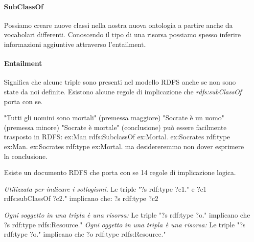 \paragraph{SubClassOf}
Possiamo creare nuove classi nella nostra nuova ontologia a partire anche da vocabolari differenti. Conoscendo il tipo di una risorsa possiamo spesso inferire informazioni aggiuntive attraverso l'entailment.
\paragraph{Entailment}
Significa che alcune triple sono presenti nel modello RDFS anche se non sono state da noi definite. Esistono alcune regole di implicazione che \textit{rdfs:subClassOf} porta con se.
\begin{info}
	\newline"Tutti gli uomini sono mortali" (premessa maggiore) \newline
	"Socrate è un uomo" (premessa minore) \newline
	"Socrate è mortale" (conclusione)\newline
	può essere facilmente trasposto in RDFS:\newline
	\textcolor{ao(english)}{ex:Man rdfs:SubclassOf ex:Mortal.}\newline
	\textcolor{ao(english)}{ex:Socrates rdf:type ex:Man.}\newline
	\textcolor{ao(english)}{ex:Socrates rdf:type ex:Mortal.}\newline
	ma desidereremmo non dover esprimere la conclusione.
\end{info}
Esiste un documento RDFS che porta con se 14 regole di implicazione logica.
\begin{info}
	\newline \textit{Utilizzata per indicare i sollogismi.}
	\newline Le triple \textcolor{ao(english)}{"?s rdf:type ?c1."} e \textcolor{ao(english)}{?c1 rdfs:subClassOf ?c2."}\newline
	implicano che:
	\textcolor{ao(english)}{?s rdf:type ?c2}
\end{info}

\begin{info}
	\newline\textit{Ogni soggetto in una tripla è una risorsa:}\newline
	Le triple \textcolor{ao(english)}{"?s rdf:type ?o."} implicano che \textcolor{ao(english)}{?s rdf:type rdfs:Resource."}\newline
	\textit{Ogni oggetto in una tripla è una risorsa:}\newline
	Le triple \textcolor{ao(english)}{"?s rdf:type ?o."} implicano che \textcolor{ao(english)}{?o rdf:type rdfs:Resource."}
\end{info}

